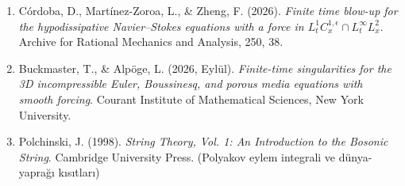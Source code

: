 \documentclass[12pt,a4paper]{article}
\begin{document}
\begin{enumerate}
    \item Córdoba, D., Martínez-Zoroa, L., \& Zheng, F. (2026). \textit{Finite time blow-up for the hypodissipative Navier--Stokes equations with a force in $L_t^1 C_x^{1,\epsilon} \cap L_t^\infty L_x^2$}. Archive for Rational Mechanics and Analysis, 250, 38.
    \item Buckmaster, T., \& Alpöge, L. (2026, Eylül). \textit{Finite-time singularities for the 3D incompressible Euler, Boussinesq, and porous media equations with smooth forcing}. Courant Institute of Mathematical Sciences, New York University.
    \item Polchinski, J. (1998). \textit{String Theory, Vol. 1: An Introduction to the Bosonic String}. Cambridge University Press. (Polyakov eylem integrali ve dünya-yaprağı kısıtları)
\end{enumerate}
\end{document}
